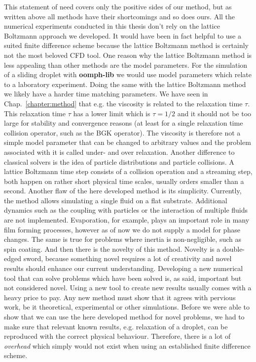 This statement of need covers only the positive sides of our method, but as written above all methods have their shortcomings and so does ours.
All the numerical experiments conducted in this thesis don't rely on the lattice Boltzmann approach we developed.
It would have been in fact helpful to use a suited finite difference scheme because the lattice Boltzmann method is certainly not the most beloved CFD tool.
One reason why the lattice Boltzmann method is less appealing than other methods are the model parameters.
For the simulation of a sliding droplet with \textbf{oomph-lib} we would use model parameters which relate to a laboratory experiment.
Doing the same with the lattice Boltzmann method we likely have a harder time matching parameters.
We have seen in Chap.~\ref{chapter:method} that e.g. the viscosity is related to the relaxation time $\tau$. 
This relaxation time $\tau$ has a lower limit which is $\tau = 1/2$ and it should not be too large for stability and convergence reasons (at least for a single relaxation time collision operator, such as the BGK operator).
The viscosity is therefore not a simple model parameter that can be changed to arbitrary values and the problem associated with it is called under- and over relaxation.
Another difference to classical solvers is the idea of particle distributions and particle collisions.
A lattice Boltzmann time step consists of a collision operation and a streaming step, both happen on rather short physical time scales, usually orders smaller than a second.
Another flaw of the here developed method is its simplicity.
Currently, the method allows simulating a single fluid on a flat substrate.
Additional dynamics such as the coupling with particles or the interaction of multiple fluids are not implemented.
Evaporation, for example, plays an important role in many film forming processes, however as of now we do not supply a model for phase changes.
The same is true for problems where inertia is non-negligible, such as spin coating.
And then there is the novelty of this method.
Novelty is a double-edged sword, because something novel requires a lot of creativity and novel results should enhance our current understanding.
Developing a new numerical tool that can solve problems which have been solved is, as said, important but not considered novel.
Using a new tool to create new results usually comes with a heavy price to pay.
Any new method must show that it agrees with pervious work, be it theoretical, experimental or other simulations.
Before we were able to show that we can use the here developed method for novel problems, we had to make sure that relevant known results, e.g. relaxation of a droplet, can be reproduced with the correct physical behaviour.
Therefore, there is a lot of \textit{overhead} which simply would not exist when using an established finite difference scheme.

